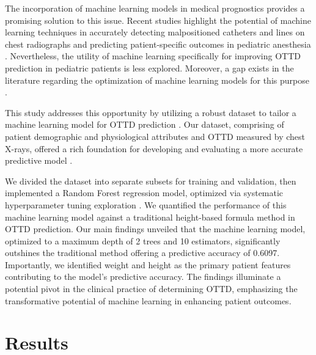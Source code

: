 \documentclass[11pt]{article}
\begin{document}
The incorporation of machine learning models in medical prognostics provides a promising solution to this issue. Recent studies highlight the potential of machine learning techniques in accurately detecting malpositioned catheters and lines on chest radiographs and predicting patient-specific outcomes in pediatric anesthesia \cite{Kara2021IdentificationAL, Kern1991ComputerizedCI, Roberts2020CommonPA}. Nevertheless, the utility of machine learning specifically for improving OTTD prediction in pediatric patients is less explored. Moreover, a gap exists in the literature regarding the optimization of machine learning models for this purpose \cite{Wu2019HyperparameterOF, Ponomareva2023HowTD}. 

This study addresses this opportunity by utilizing a robust dataset to tailor a machine learning model for OTTD prediction \cite{Uya2020PointofCareUI, Dillier2004LaryngealDD}. Our dataset, comprising of patient demographic and physiological attributes and OTTD measured by chest X-rays, offered a rich foundation for developing and evaluating a more accurate predictive model \cite{Ross2018DiscoveringPA}.

We divided the dataset into separate subsets for training and validation, then implemented a Random Forest regression model, optimized via systematic hyperparameter tuning exploration \cite{Wu2019HyperparameterOF, Rauber2017FoolboxAP}. We quantified the performance of this machine learning model against a traditional height-based formula method in OTTD prediction. Our main findings unveiled that the machine learning model, optimized to a maximum depth of 2 trees and 10 estimators, significantly outshines the traditional method offering a predictive accuracy of 0.6097. Importantly, we identified weight and height as the primary patient features contributing to the model's predictive accuracy. The findings illuminate a potential pivot in the clinical practice of determining OTTD, emphasizing the transformative potential of machine learning in enhancing patient outcomes.

\section*{Results}
\end{document}
